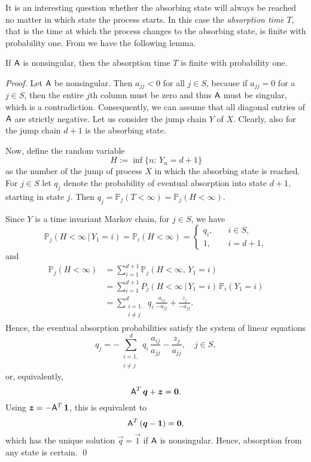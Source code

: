\documentclass[smallextended]{svjour3}
\renewcommand{\P}{\mathbb{P}}
\newcommand{\suml}{\sum\limits}
\begin{document}
It is an interesting question whether the absorbing state will always be reached no matter in which state the process starts.
In this case the \emph{absorption time} $T$, that is the time at which the process changes to the absorbing state, is finite with probability one.
From \citet{Neuts1981} we have the following lemma.

\begin{lemma}\label{lem:Neuts1}
    If $\mathsf{A}$ is nonsingular, then the absorption time $T$ is finite with probability one.
\end{lemma}

\begin{proof}

Let $\mathsf{A}$ be nonsingular.
Then $a_{jj}<0$ for all $j\in S$, because if $a_{jj}=0$ for a $j\in S$, then the entire $j$th column must be zero and thus $\mathsf{A}$ must be singular, which is a contradiction.
Consequently, we can assume that all diagonal entries of $\mathsf{A}$ are strictly negative.
Let us consider the jump chain $Y$ of $X$.
Clearly, also for the jump chain $d+1$ is the absorbing state.

Now, define the random variable
\[
    H := \inf\{n:\,Y_n=d+1\}
\]
as the number of the jump of process $X$ in which the absorbing state is reached.
For $j\in S$ let $q_j$ denote the probability of eventual absorption into state $d+1$, starting in state $j$.
Then $q_j = \P_j(T<\infty) = \P_j(H<\infty)$.

Since $Y$ is a time invariant Markov chain, for $j\in S$, we have
\[
    \P_j(H<\infty\,|\,Y_1=i) = \P_i(H<\infty) =
    \begin{cases}
        q_i,\quad & i\in S,\\
        1,\quad & i=d+1,
    \end{cases}
\]
and
\begin{align*}
    \P_j(H<\infty) &= \suml_{i=1}^{d+1}\P_j(H<\infty,\,Y_1=i)\\
    &= \suml_{i=1}^{d+1} P_j(H<\infty\,|\,Y_1=i)\,\P_i(Y_1=i)\\
    &= \suml_{\substack{i=1,\\i\neq j}}^d q_i\,\frac{a_{ij}}{-a_{jj}} + \frac{z_j}{-a_{jj}}.
\end{align*}
Hence, the eventual absorption probabilities satisfy the system of linear equations
\[
  q_j = -\suml_{\substack{i=1,\\i\neq j}}^d q_i\,\frac{a_{ij}}{a_{jj}} - \frac{z_j}{a_{jj}},\quad j\in S,
\]
or, equivalently,
\[
    \tens{A}^T\,\vec{q} + \vec{z} = \vec{0}.
\]
Using $\vec{z} = -\tens{A}^T\,\vec{1}$, this is equivalent to
\[
    \tens{A}^T\,(\vec{q}-\vec{1}) = \vec{0},
\]
which has the unique solution $\vec{q}=\vec{1}$ if $\mathsf{A}$ is nonsingular.
Hence, absorption from any state is certain.
\qed
\end{proof}
\end{document}
